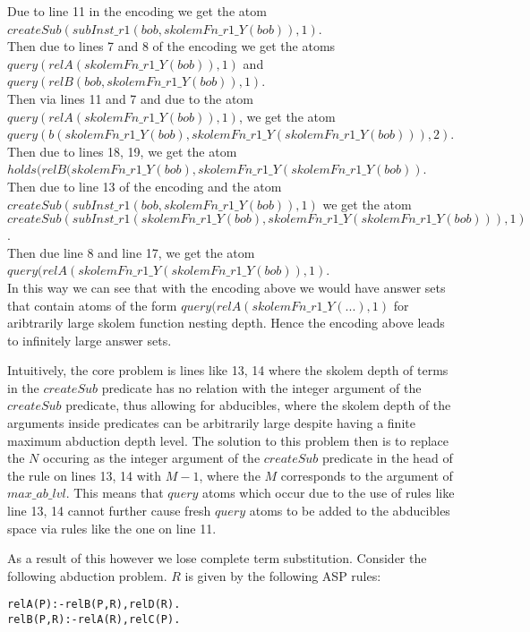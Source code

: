\documentclass[sigconf]{acmart}
\begin{document}
Due to line 11 in the encoding we get the atom $createSub(subInst\_r1(bob,skolemFn\_r1\_Y(bob)),1)$.\\
Then due to lines 7 and 8 of the encoding we get the atoms $query(relA(skolemFn\_r1\_Y(bob)),1)$ and $query(relB(bob,skolemFn\_r1\_Y(bob)),1)$.\\

Then via lines 11 and 7 and due to the atom $query(relA(skolemFn\_r1\_Y(bob)),1)$, we get the atom $query(b(skolemFn\_r1\_Y(bob), skolemFn\_r1\_Y(skolemFn\_r1\_Y(bob))),2)$. \\

Then due to lines 18, 19, we get the atom $holds(relB(skolemFn\_r1\_Y(bob), skolemFn\_r1\_Y(skolemFn\_r1\_Y(bob))$.\\

Then due to line 13 of the encoding and the atom $createSub(subInst\_r1(bob,skolemFn\_r1\_Y(bob)),1)$ we get the atom $createSub(subInst\_r1(skolemFn\_r1\_Y(bob), skolemFn\_r1\_Y(skolemFn\_r1\_Y(bob))),1)$. \\

Then due line 8 and line 17, we get the atom $query(relA(skolemFn\_r1\_Y(skolemFn\_r1\_Y(bob)),1)$.\\

In this way we can see that with the encoding above we would have answer sets
that contain atoms of the form $query(relA(skolemFn\_r1\_Y(...),1)$ for
aribtrarily large skolem function nesting depth. Hence the encoding above
leads to infinitely large answer sets.

Intuitively, the core problem is lines like 13, 14 where the skolem depth of
terms in the $createSub$ predicate has no relation with the integer argument
of the $createSub$ predicate, thus allowing for abducibles, where the skolem
depth of the arguments inside predicates can be arbitrarily large despite
having a finite maximum abduction depth level. The solution to this problem
then is to replace the $N$ occuring as the integer argument of the $createSub$
predicate in the head of the rule on lines 13, 14 with $M-1$, where the $M$
corresponds to the argument of $max\_ab\_lvl$. This means that $query$ atoms
which occur due to the use of rules like line 13, 14 cannot further cause
fresh $query$ atoms to be added to the abducibles space via rules like the one
on line 11.

As a result of this however we lose complete term substitution. Consider the following abduction problem. $R$ is given by the following ASP rules:
\begin{verbatim}
relA(P):-relB(P,R),relD(R).
relB(P,R):-relA(R),relC(P).
\end{verbatim}
\end{document}
